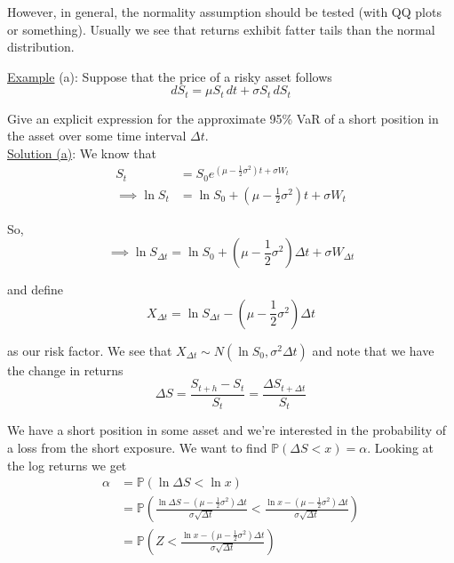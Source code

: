 \documentclass[12pt]{article}
\newlength\tindent
\renewcommand{\indent}{\hspace*{\tindent}}
\renewcommand{\P}{\mathbb P}
\begin{document}
\indent However, in general, the normality assumption should be tested (with QQ plots or something). Usually we see that returns exhibit fatter tails than the normal distribution.

\underline{Example} (a): Suppose that the price of a risky asset follows
\begin{equation*}
	dS_t = \mu S_t \,dt + \sigma S_t\,dS_t
\end{equation*}

\indent Give an explicit expression for the approximate 95\% VaR of a short position in the asset over some time interval $\Delta t$. \\

\underline{Solution (a)}: We know that
\begin{align*}
	S_t &= S_0 e^{(\mu - \frac{1}{2}\sigma^2) t + \sigma W_t} \\
	\implies \ln S_t &= \ln S_0 + \left( \mu - \frac{1}{2}\sigma^2 \right)t + \sigma W_t
\end{align*}

So,
\begin{equation*}
	\implies \ln S_{\Delta t} = \ln S_0 + \left( \mu - \frac{1}{2}\sigma^2 \right)\Delta t + \sigma W_{\Delta t}
\end{equation*}

and define
\begin{equation*}
	X_{\Delta t} = \ln S_{\Delta t} - \left( \mu - \frac{1}{2}\sigma^2 \right) \Delta t
\end{equation*}

as our risk factor. We see that $X_{\Delta t} \sim N \left( \ln S_0, \sigma^2 \Delta t \right)$ and note that we have the change in returns
\begin{equation*}
	\Delta S = \frac{S_{t + h} - S_t}{ S_t } = \frac{ \Delta S_{t + \Delta t} }{ S_t } 
\end{equation*}

\indent We have a short position in some asset and we're interested in the probability of a loss from the short exposure. We want to find $\P(\Delta S < x) = \alpha$. Looking at the log returns we get
\begin{align*}
	\alpha &= \P ( \ln \Delta S < \ln x ) \\
	&= \P \left( \frac{ \ln \Delta S - \left( \mu - \frac{1}{2}\sigma^2 \right) \Delta t }{\sigma\sqrt{\Delta t}} < \frac{ \ln x - \left( \mu - \frac{1}{2}\sigma^2 \right) \Delta t }{\sigma\sqrt{\Delta t}} \right) \\ 
	&= \P \left( Z < \frac{ \ln x - \left( \mu - \frac{1}{2}\sigma^2 \right) \Delta t }{\sigma\sqrt{\Delta t}} \right)
\end{align*}
\end{document}
